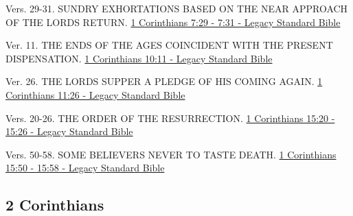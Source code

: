 \documentclass[
  ignorenonframetext,
]{beamer}
\begin{document}
\begin{frame}{7}
\label{section-202}
\begin{block}{Vers. 29-31. SUNDRY EXHORTATIONS BASED ON THE NEAR
APPROACH OF THE LORD\textquotesingle S RETURN.}
\label{vers.-29-31.-sundry-exhortations-based-on-the-near-approach-of-the-lords-return.}
\href{https://read.lsbible.org/?q=1cor7\%3A29-31}{1 Corinthians 7:29 -
7:31 - Legacy Standard Bible}
\end{block}
\end{frame}

\begin{frame}{10}
\label{section-203}
\begin{block}{Ver. 11. THE ENDS OF THE AGES COINCIDENT WITH THE PRESENT
DISPENSATION.}
\label{ver.-11.-the-ends-of-the-ages-coincident-with-the-present-dispensation.}
\href{https://read.lsbible.org/?q=1cor10\%3A11}{1 Corinthians 10:11 -
Legacy Standard Bible}
\end{block}
\end{frame}

\begin{frame}{11}
\label{section-204}
\begin{block}{Ver. 26. THE LORD\textquotesingle S SUPPER A PLEDGE OF HIS
COMING AGAIN.}
\label{ver.-26.-the-lords-supper-a-pledge-of-his-coming-again.}
\href{https://read.lsbible.org/?q=1cor11\%3A26}{1 Corinthians 11:26 -
Legacy Standard Bible}
\end{block}
\end{frame}

\begin{frame}{15}
\label{section-205}
\begin{block}{Vers. 20-26. THE ORDER OF THE RESURRECTION.}
\label{vers.-20-26.-the-order-of-the-resurrection.}
\href{https://read.lsbible.org/?q=1cor15\%3A20-26}{1 Corinthians 15:20 -
15:26 - Legacy Standard Bible}
\end{block}

\begin{block}{Vers. 50-58. SOME BELIEVERS NEVER TO TASTE DEATH.}
\label{vers.-50-58.-some-believers-never-to-taste-death.}
\href{https://read.lsbible.org/?q=1cor15\%3A50-58}{1 Corinthians 15:50 -
15:58 - Legacy Standard Bible}
\end{block}
\end{frame}

\subsection{2 Corinthians}\label{corinthians-1}
\end{document}
